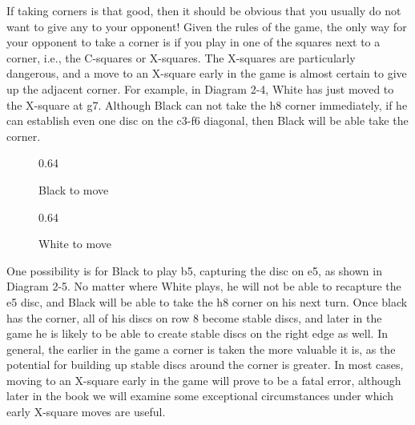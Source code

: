 \documentclass[a4paper,12pt]{book}
\newcommand{\scalefactortwoup}{0.64}
\begin{document}
If taking corners is that good, then it should be obvious that you usually do not
want to give any to your opponent! Given the rules of the game, the only way for your
opponent to take a corner is if you play in one of the squares next to a corner, i.e., the
C-squares or X-squares. The X-squares are particularly dangerous, and a move to an
X-square early in the game is almost certain to give up the adjacent corner. For example, in Diagram 2-4, White has just moved to the X-square at g7. Although Black
can not take the h8 corner immediately, if he can establish even one disc on the c3-f6
diagonal, then Black will be able take the corner.

\begin{figure}[h]
\begin{center}
\begin{minipage}[t]{.35\textwidth}
\begin{othelloboard}{\scalefactortwoup}
\dotmarkings
{}
\end{othelloboard}
\caption{Black to move}
\end{minipage}
\hspace{24pt}
\begin{minipage}[t]{.35\textwidth}
\begin{othelloboard}{\scalefactortwoup}
\dotmarkings
{}

\end{othelloboard}
\caption{White to move}
\end{minipage}
\end{center}
\end{figure}

One possibility is for Black to play b5, capturing the disc on e5, as shown in
Diagram 2-5. No matter where White plays, he will not be able to recapture the e5
disc, and Black will be able to take the h8 corner on his next turn. Once black has the
corner, all of his discs on row 8 become stable discs, and later in the game he is likely
to be able to create stable discs on the right edge as well. In general, the earlier in the
game a corner is taken the more valuable it is, as the potential for building up stable
discs around the corner is greater. In most cases, moving to an X-square early in the
game will prove to be a fatal error, although later in the book we will examine some
exceptional circumstances under which early X-square moves are useful.
\end{document}
